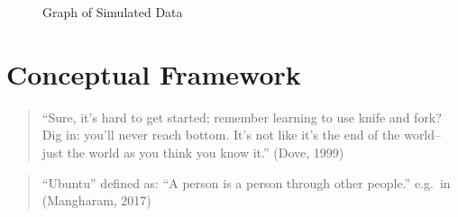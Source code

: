 \documentclass[
  letterpaper,
  DIV=11,
  numbers=noendperiod]{scrreprt}
\begin{document}
\begin{figure}


\caption{\label{fig-data}Graph of Simulated Data}

\end{figure}%


\chapter{Conceptual Framework}\label{sec-conceptualframework}

\begin{quote}
``Sure, it's hard to get started; remember learning to use knife and
fork? Dig in: you'll never reach bottom. It's not like it's the end of
the world--just the world as you think you know it.'' (Dove, 1999)
\end{quote}

\begin{quote}
``Ubuntu'' defined as: ``A person is a person through other people.''
e.g.~in (Mangharam, 2017)
\end{quote}
\end{document}
